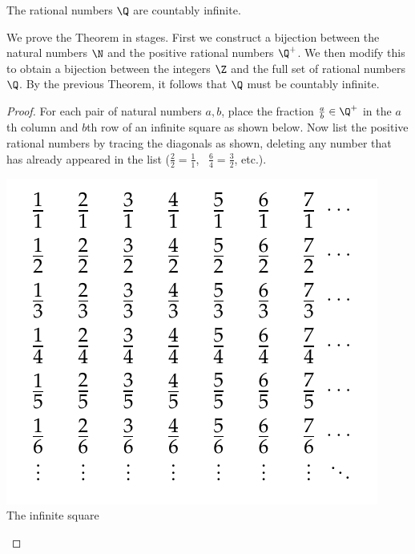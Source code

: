 \begin{thm}\label{thm:qcount}
The rational numbers $\Q$ are countably infinite.
\end{thm}

\noindent We prove the Theorem in stages. First we construct a bijection between the natural numbers $\N$ and the positive rational numbers $\Q^+$. We then modify this to obtain a bijection between the integers $\Z$ and the full set of rational numbers $\Q$. By the previous Theorem, it follows that $\Q$ must be countably infinite.

\begin{proof}
For each pair of natural numbers $a,b$, place the fraction $\frac ab\in\Q^+$ in the $a$th column and $b$th row of an infinite square as shown below. Now list the positive rational numbers by tracing the diagonals as shown, deleting any number that has already appeared in the list ($\frac 22=\frac 11$, \ $\frac 64=\frac 32$, etc.).
\begin{center}
\begin{minipage}{0.38\textwidth}\centering
\includegraphics[width=\textwidth]{cardinality-01-qcount}\\
The infinite square
\end{minipage}\qquad\qquad\qquad
\begin{minipage}{0.38\textwidth}\centering

\end{minipage}
\end{center}
\end{proof}
